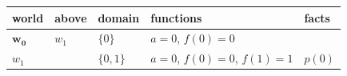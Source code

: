 \documentclass[border=5pt]{standalone}
\begin{document}
\begin{tabular}{lllll}
world & above & domain & functions & facts \\
\hline
$\mathbf{w_{0}}$ & $w_{1}$ & $\{0\}$ & $a = 0$, $f(0) = 0$ &  \\
$w_{1}$ &  & $\{0, 1\}$ & $a = 0$, $f(0) = 0$, $f(1) = 1$ & $p(0)$ \\
\end{tabular}
\end{document}
